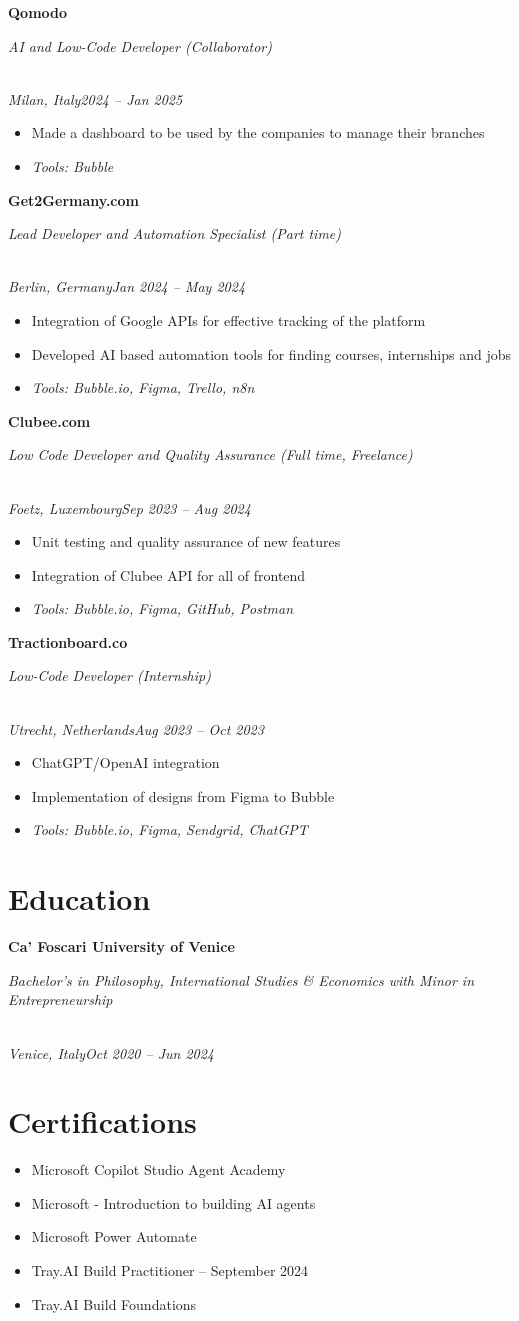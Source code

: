 \documentclass[a4paper,10pt]{article}
\newcommand{\role}[4]{\vspace{3pt}\noindent\hspace{0.6em}\parbox[t]{0.38\textwidth}{\raggedright\textbf{#1}}\hfill\parbox[t]{0.58\textwidth}{\raggedleft\textit{#2}}\\{\textit{#3}\hfill\textit{#4}}\vspace{1pt}}
\begin{document}
\role{Qomodo}{AI and Low-Code Developer (Collaborator)}{Milan, Italy}{2024 -- Jan 2025}
\begin{itemize}
\item Made a dashboard to be used by the companies to manage their branches
\item \textit{Tools: Bubble}
\end{itemize}

\role{Get2Germany.com}{Lead Developer and Automation Specialist (Part time)}{Berlin, Germany}{Jan 2024 -- May 2024}
\begin{itemize}
\item Integration of Google APIs for effective tracking of the platform
\item Developed AI based automation tools for finding courses, internships and jobs
\item \textit{Tools: Bubble.io, Figma, Trello, n8n}
\end{itemize}

\role{Clubee.com}{Low Code Developer and Quality Assurance (Full time, Freelance)}{Foetz, Luxembourg}{Sep 2023 -- Aug 2024}
\begin{itemize}
\item Unit testing and quality assurance of new features
\item Integration of Clubee API for all of frontend
\item \textit{Tools: Bubble.io, Figma, GitHub, Postman}
\end{itemize}

\role{Tractionboard.co}{Low-Code Developer (Internship)}{Utrecht, Netherlands}{Aug 2023 -- Oct 2023}
\begin{itemize}
\item ChatGPT/OpenAI integration
\item Implementation of designs from Figma to Bubble
\item \textit{Tools: Bubble.io, Figma, Sendgrid, ChatGPT}
\end{itemize}

\section{Education}
\role{Ca' Foscari University of Venice}{Bachelor's in Philosophy, International Studies \& Economics with Minor in Entrepreneurship}{Venice, Italy}{Oct 2020 -- Jun 2024}

\section{Certifications}
\begin{itemize}
\item Microsoft Copilot Studio Agent Academy
\item Microsoft - Introduction to building AI agents
\item Microsoft Power Automate
\item Tray.AI Build Practitioner -- September 2024
\item Tray.AI Build Foundations
\end{itemize}
\end{document}
